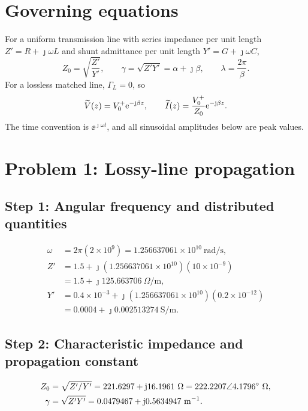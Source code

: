 \documentclass[12pt,a4paper]{article}
\begin{document}
\MakeTitlePage
\tableofcontents
\newpage

\section{Governing equations}

For a uniform transmission line with series impedance per unit length
$Z'=R+\jmath\omega L$ and shunt admittance per unit length
$Y'=G+\jmath\omega C$,
\begin{equation}
Z_0=\sqrt{\frac{Z'}{Y'}},
\qquad
\gamma=\sqrt{Z'Y'}=\alpha+\jmath\beta,
\qquad
\lambda=\frac{2\pi}{\beta}.
\end{equation}
For a lossless matched line, $\Gamma_L=0$, so
\begin{equation}
\widetilde{V}(z)=V_0^+\mathrm{e}^{-\mathrm{j}\beta z},
\qquad
\widetilde{I}(z)=\frac{V_0^+}{Z_0}\mathrm{e}^{-\mathrm{j}\beta z}.
\end{equation}
The time convention is $\ee^{\jmath\omega t}$, and all sinusoidal amplitudes
below are peak values.

\section{Problem 1: Lossy-line propagation}

\LineElementDiagram

\subsection{Step 1: Angular frequency and distributed quantities}

\begin{align*}
\omega&=2\pi(2\times10^9)=1.256637061\times10^{10}~\mathrm{rad/s},\\
Z'&=1.5+\jmath(1.256637061\times10^{10})(10\times10^{-9})\\
  &=1.5+\jmath125.663706~\Omega/\mathrm{m},\\
Y'&=0.4\times10^{-3}
+\jmath(1.256637061\times10^{10})(0.2\times10^{-12})\\
  &=0.0004+\jmath0.002513274~\mathrm{S/m}.
\end{align*}

\subsection{Step 2: Characteristic impedance and propagation constant}

\begin{align}
Z_0&=\sqrt{Z'/Y'}=221.6297+\mathrm{j}16.1961~\Omega
=222.2207\angle4.1796^{\circ}~\Omega,\\
\gamma&=\sqrt{Z'Y'}=0.0479467+\mathrm{j}0.5634947~\mathrm{m}^{-1}.
\end{align}
\end{document}
